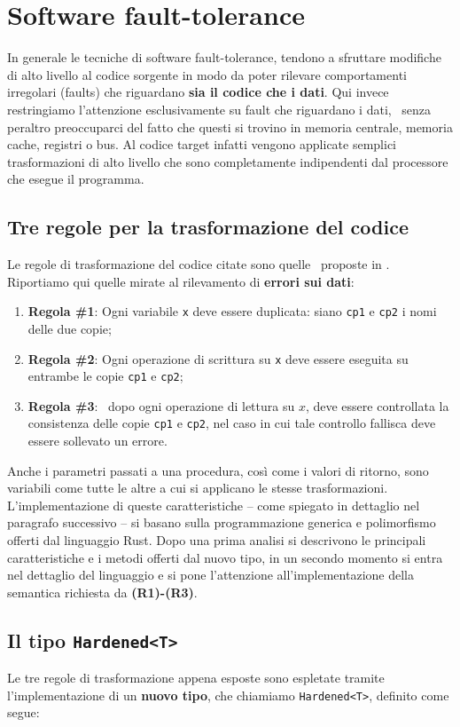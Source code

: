 \section{Software fault-tolerance} \label{sec:hardened}
In generale le tecniche di software fault-tolerance, tendono a sfruttare modifiche di alto livello al codice sorgente in modo da poter rilevare comportamenti irregolari (faults) che riguardano \textbf{sia il codice che i dati}. Qui invece restringiamo l’attenzione esclusivamente su fault che riguardano i dati,  senza peraltro preoccuparci del fatto che questi si trovino in memoria centrale, memoria cache, registri o bus. Al codice target infatti vengono applicate semplici trasformazioni di alto livello che sono completamente indipendenti dal processore che esegue il programma. 
\subsection{Tre regole per la trasformazione del codice}
Le regole di trasformazione del codice citate sono quelle  proposte in \cite{802887}. Riportiamo qui quelle mirate al rilevamento di \textbf{errori sui dati}:
\begin{enumerate}
    \itemsep-0.2em
    \item \textbf{Regola \#1}: Ogni variabile \texttt{x} deve essere duplicata: siano \texttt{cp1} e \texttt{cp2} i nomi delle due copie;
    \item \textbf{Regola \#2}: Ogni operazione di scrittura su \texttt{x} deve essere eseguita su entrambe le copie \texttt{cp1} e \texttt{cp2};
    \item \textbf{Regola \#3}:  dopo ogni operazione di lettura su $x$, deve essere controllata la consistenza delle copie \texttt{cp1} e \texttt{cp2}, nel caso in cui tale controllo fallisca deve essere sollevato un errore.
\end{enumerate}
Anche i parametri passati a una procedura, così come i valori di ritorno, sono variabili come tutte le altre a cui si applicano le stesse trasformazioni. L'implementazione di queste caratteristiche -- come spiegato in dettaglio nel paragrafo successivo -- si basano sulla programmazione generica e polimorfismo offerti dal linguaggio Rust. Dopo una prima analisi si descrivono le principali caratteristiche e i metodi offerti dal nuovo tipo, in un secondo momento si entra nel dettaglio del linguaggio e si pone l'attenzione all'implementazione della semantica richiesta da \textbf{(R1)-(R3)}.

\subsection{Il tipo \texttt{Hardened<T>}}
Le tre regole di trasformazione appena esposte sono espletate tramite l'implementazione di un \textbf{nuovo tipo}, che chiamiamo \texttt{Hardened<T>}, definito come segue: 

